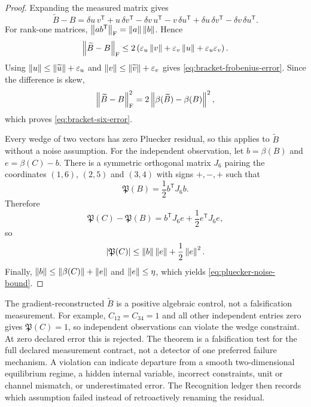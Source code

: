 \begin{proof}
Expanding the measured matrix gives
\[
\widetilde B-B
=\delta u\,v^{\mathsf T}+u\,\delta v^{\mathsf T}
-\delta v\,u^{\mathsf T}-v\,\delta u^{\mathsf T}
+\delta u\,\delta v^{\mathsf T}
-\delta v\,\delta u^{\mathsf T}.
\]
For rank-one matrices, $\left\lVert ab^{\mathsf T}\right\rVert_{\mathrm F}=\left\lVert a\right\rVert\left\lVert b\right\rVert$.  Hence
\[
\left\lVert\widetilde B-B\right\rVert_{\mathrm F}
\le2\left(
\varepsilon_u\left\lVert v\right\rVert
+\varepsilon_v\left\lVert u\right\rVert
+\varepsilon_u\varepsilon_v
\right).
\]
Using $\left\lVert u\right\rVert\le\left\lVert\widetilde u\right\rVert+\varepsilon_u$ and
$\left\lVert v\right\rVert\le\left\lVert\widetilde v\right\rVert+\varepsilon_v$ gives \eqref{eq:bracket-frobenius-error}.  Since the difference is skew,
\[
\left\lVert\widetilde B-B\right\rVert_{\mathrm F}^2
=2\left\lVert\beta(\widetilde B)-\beta(B)\right\rVert^2,
\]
which proves \eqref{eq:bracket-six-error}.

Every wedge of two vectors has zero Pluecker residual, so this applies to
$\widetilde B$ without a noise assumption. For the independent observation,
let $b=\beta(B)$ and $e=\beta(C)-b$.  There is a symmetric orthogonal matrix $J_6$ pairing the coordinates $(1,6)$, $(2,5)$ and $(3,4)$ with signs $+,-,+$ such that
\[
\mathfrak P(B)=\frac12b^{\mathsf T}J_6b.
\]
Therefore
\[
\mathfrak P(C)-\mathfrak P(B)
=b^{\mathsf T}J_6e+\frac12e^{\mathsf T}J_6e,
\]
so
\[
\left|\mathfrak P(C)\right|
\le\left\lVert b\right\rVert\left\lVert e\right\rVert+\frac12\left\lVert e\right\rVert^2.
\]
Finally, $\left\lVert b\right\rVert\le\left\lVert\beta(C)\right\rVert+\left\lVert e\right\rVert$ and $\left\lVert e\right\rVert\le\eta$, which yields \eqref{eq:pluecker-noise-bound}.
\end{proof}

\begin{remark}
The gradient-reconstructed $\widetilde B$ is a positive algebraic control,
not a falsification measurement. For example, $C_{12}=C_{34}=1$ and all other
independent entries zero gives $\mathfrak P(C)=1$, so independent observations
can violate the wedge constraint. At zero declared error this is rejected.
The theorem is a falsification test for the full declared measurement contract, not a detector of one preferred failure mechanism.  A violation can indicate departure from a smooth two-dimensional equilibrium regime, a hidden internal variable, incorrect constraints, unit or channel mismatch, or underestimated error.  The Recognition ledger then records which assumption failed instead of retroactively renaming the residual.
\end{remark}
